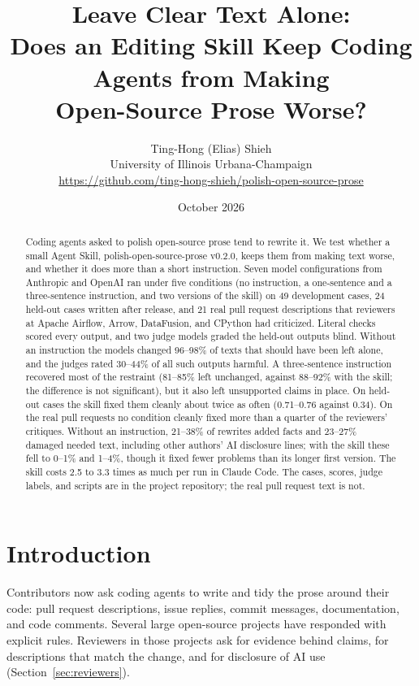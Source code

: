 \documentclass[11pt]{article}
\title{Leave Clear Text Alone:\\Does an Editing Skill Keep Coding Agents from Making\\Open-Source Prose Worse?}
\author{Ting-Hong (Elias) Shieh\\University of Illinois Urbana-Champaign\\\small\url{https://github.com/ting-hong-shieh/polish-open-source-prose}}
\date{October 2026}
\begin{document}
\maketitle

\begin{abstract}
Coding agents asked to polish open-source prose tend to rewrite it. We test whether a
small Agent Skill, polish-open-source-prose v0.2.0, keeps them from making text worse, and
whether it does more than a short instruction. Seven model configurations from Anthropic
and OpenAI ran under five conditions (no instruction, a one-sentence and a three-sentence
instruction, and two versions of the skill) on 49 development cases, 24 held-out cases
written after release, and 21 real pull request descriptions that reviewers at Apache
Airflow, Arrow, DataFusion, and CPython had criticized. Literal checks scored every
output, and two judge models graded the held-out outputs blind. Without an instruction
the models changed 96--98\% of texts that should have been left alone, and the judges
rated 30--44\% of all such outputs harmful. A three-sentence instruction recovered most of
the restraint (81--85\% left unchanged, against 88--92\% with the skill; the difference is
not significant), but it also left unsupported claims in place. On held-out cases the
skill fixed them cleanly about twice as often (0.71--0.76 against 0.34). On the real pull
requests no condition cleanly fixed more than a quarter of the reviewers' critiques.
Without an instruction, 21--38\% of rewrites added facts and 23--27\% damaged needed text,
including other authors' AI disclosure lines; with the skill these fell to 0--1\% and
1--4\%, though it fixed fewer problems than its longer first version. The skill costs 2.5
to 3.3 times as much per run in Claude Code. The cases, scores, judge labels, and scripts
are in the project repository; the real pull request text is not.
\end{abstract}

\section{Introduction}

Contributors now ask coding agents to write and tidy the prose around their code: pull
request descriptions, issue replies, commit messages, documentation, and code comments.
Several large open-source projects have responded with explicit rules. Reviewers in those
projects ask for evidence behind claims, for descriptions that match the change, and for
disclosure of AI use (Section~\ref{sec:reviewers}).
\end{document}
